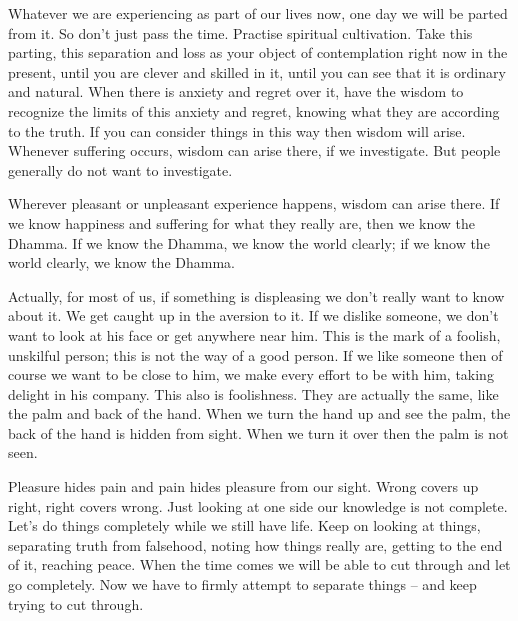 Whatever we are experiencing as part of our lives now, one day we will be parted from it. So don't just pass the time. Practise spiritual cultivation. Take this parting, this separation and loss as your object of contemplation right now in the present, until you are clever and skilled in it, until you can see that it is ordinary and natural. When there is anxiety and regret over it, have the wisdom to recognize the limits of this anxiety and regret, knowing what they are according to the truth. If you can consider things in this way then wisdom will arise. Whenever suffering occurs, wisdom can arise there, if we investigate. But people generally do not want to investigate.

Wherever pleasant or unpleasant experience happens, wisdom can arise there. If we know happiness and suffering for what they really are, then we know the Dhamma. If we know the Dhamma, we know the world clearly; if we know the world clearly, we know the Dhamma.

Actually, for most of us, if something is displeasing we don't really want to know about it. We get caught up in the aversion to it. If we dislike someone, we don't want to look at his face or get anywhere near him. This is the mark of a foolish, unskilful person; this is not the way of a good person. If we like someone then of course we want to be close to him, we make every effort to be with him, taking delight in his company. This also is foolishness. They are actually the same, like the palm and back of the hand. When we turn the hand up and see the palm, the back of the hand is hidden from sight. When we turn it over then the palm is not seen.

Pleasure hides pain and pain hides pleasure from our sight. Wrong covers up right, right covers wrong. Just looking at one side our knowledge is not complete. Let's do things completely while we still have life. Keep on looking at things, separating truth from falsehood, noting how things really are, getting to the end of it, reaching peace. When the time comes we will be able to cut through and let go completely. Now we have to firmly attempt to separate things -- and keep trying to cut through.

